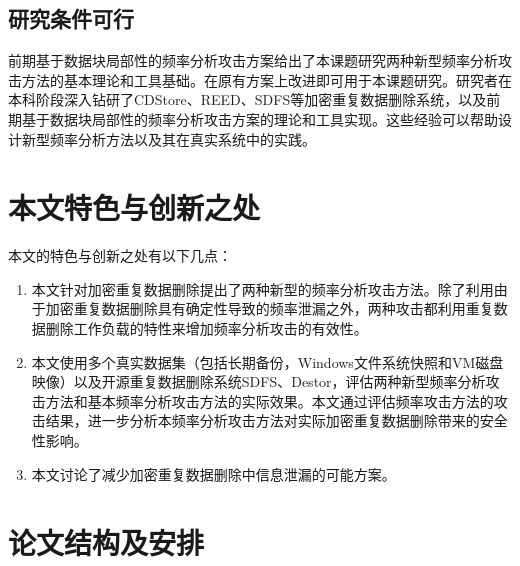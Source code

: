 \subsection{研究条件可行}

前期基于数据块局部性的频率分析攻击方案给出了本课题研究两种新型频率分析攻击方法的基本理论和工具基础。在原有方案上改进即可用于本课题研究。研究者在本科阶段深入钻研了CDStore、REED、SDFS等加密重复数据删除系统，以及前期基于数据块局部性的频率分析攻击方案的理论和工具实现。这些经验可以帮助设计新型频率分析方法以及其在真实系统中的实践。

\section{本文特色与创新之处}

本文的特色与创新之处有以下几点：

\begin{enumerate}
    \item 本文针对加密重复数据删除提出了两种新型的频率分析攻击方法。除了利用由于加密重复数据删除具有确定性导致的频率泄漏之外，两种攻击都利用重复数据删除工作负载的特性来增加频率分析攻击的有效性。
    \item 本文使用多个真实数据集（包括长期备份，Windows文件系统快照和VM磁盘映像）以及开源重复数据删除系统SDFS、Destor，评估两种新型频率分析攻击方法和基本频率分析攻击方法的实际效果。本文通过评估频率攻击方法的攻击结果，进一步分析本频率分析攻击方法对实际加密重复数据删除带来的安全性影响。
    \item 本文讨论了减少加密重复数据删除中信息泄漏的可能方案。
\end{enumerate}

\section{论文结构及安排}

